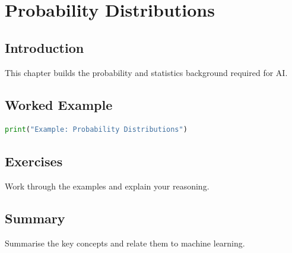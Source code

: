 \chapter{Probability Distributions}
\label{chap:vol4-23}



\section{Introduction}
This chapter builds the probability and statistics background required for AI.

\section{Worked Example}
\begin{lstlisting}[language=Python]
print("Example: Probability Distributions")
\end{lstlisting}

\section{Exercises}
\begin{exercise}
Work through the examples and explain your reasoning.
\end{exercise}

\section{Summary}
Summarise the key concepts and relate them to machine learning.

